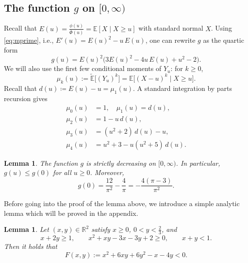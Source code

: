 \documentclass[11pt]{article}
\newtheorem{lemma}[theorem]{Lemma}
\begin{document}
\subsection{The function $g$ on $[0,\infty)$}
Recall that $E(u)=\frac{\phi(u)}{\overline{\Phi}(u)}=\mathbb{E}[X\mid X\ge u]$ with standard normal $X$. Using \eqref{eq:mprime}, i.e., $E'(u)=E(u)^2-u\,E(u)$, one can rewrite $g$ as the quartic form
\begin{equation}\label{eq:g-expanded}
g(u)=E(u)^2\bigl(3E(u)^2-4u\,E(u)+u^2-2\bigr).
\end{equation}
We will also use the first few conditional moments of $Y_u$: for $k\geq 0$, 
\[
\mu_k(u):= \tilde{\mathbb{E}}\bigl[(Y_u)^k\bigr]
=\mathbb{E}\bigl[(X-u)^k\mid X\ge u\bigr].
\]
Recall that $d(u)\coloneqq E(u)-u=\mu_1(u)$. A standard integration by parts recursion gives
\begin{align}
\mu_0(u)&=1,\quad 
\mu_1(u)=d(u),\label{eq:moments-TOBECHECKED}\\
\mu_2(u)&=1-u\,d(u),\nonumber\\
\mu_3(u)&=(u^2+2)\,d(u)-u,\nonumber\\
\mu_4(u)&=u^2+3-u(u^2+5)\,d(u).\nonumber
\end{align}

\begin{lemma}\label{lem:g-decreasing-positive}
The function $g$ is strictly decreasing on $[0,\infty)$. In particular, $g(u)\le g(0)$ for all $u\ge 0$.
Moreover,
\[
g(0)=\frac{12}{\pi^2}-\frac{4}{\pi}=-\frac{4(\pi-3)}{\pi^2}.
\]
\end{lemma}
Before going into the proof of the lemma above, we introduce a simple analytic lemma which will be proved in the appendix.
\begin{lemma}\label{lem:F negative-TOBECHECKED}
Let $(x,y)\in\mathbb R^2$ satisfy $x\ge 0$, $0<y<\frac{2}{3}$, and
\begin{equation}\label{eq:consFneg_lemma}
x+2y\ge 1,\qquad
x^2+xy-3x-3y+2\ge 0,\qquad
x+y<1.
\end{equation}
Then it holds that 
\begin{equation}\label{eq:FdefFneg_lemma-TOBECHECKED}
F(x,y):=x^2+6xy+6y^2-x-4y<0.
\end{equation}
\end{lemma}
\end{document}
